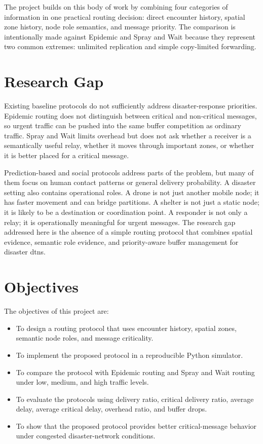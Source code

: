 The project builds on this body of work by combining four categories of information in one practical routing decision: direct encounter history, spatial zone history, node role semantics, and message priority. The comparison is intentionally made against Epidemic and Spray and Wait because they represent two common extremes: unlimited replication and simple copy-limited forwarding.

\section{Research Gap}
Existing baseline protocols do not sufficiently address disaster-response priorities. Epidemic routing does not distinguish between critical and non-critical messages, so urgent traffic can be pushed into the same buffer competition as ordinary traffic. Spray and Wait limits overhead but does not ask whether a receiver is a semantically useful relay, whether it moves through important zones, or whether it is better placed for a critical message.

Prediction-based and social protocols address parts of the problem, but many of them focus on human contact patterns or general delivery probability. A disaster setting also contains operational roles. A drone is not just another mobile node; it has faster movement and can bridge partitions. A shelter is not just a static node; it is likely to be a destination or coordination point. A responder is not only a relay; it is operationally meaningful for urgent messages. The research gap addressed here is the absence of a simple routing protocol that combines spatial evidence, semantic role evidence, and priority-aware buffer management for disaster \acp{dtn}.

\section{Objectives}
The objectives of this project are:

\begin{itemize}
	\item To design a routing protocol that uses encounter history, spatial zones, semantic node roles, and message criticality.
	\item To implement the proposed protocol in a reproducible Python simulator.
	\item To compare the protocol with Epidemic routing and Spray and Wait routing under low, medium, and high traffic levels.
	\item To evaluate the protocols using delivery ratio, critical delivery ratio, average delay, average critical delay, overhead ratio, and buffer drops.
	\item To show that the proposed protocol provides better critical-message behavior under congested disaster-network conditions.
\end{itemize}

